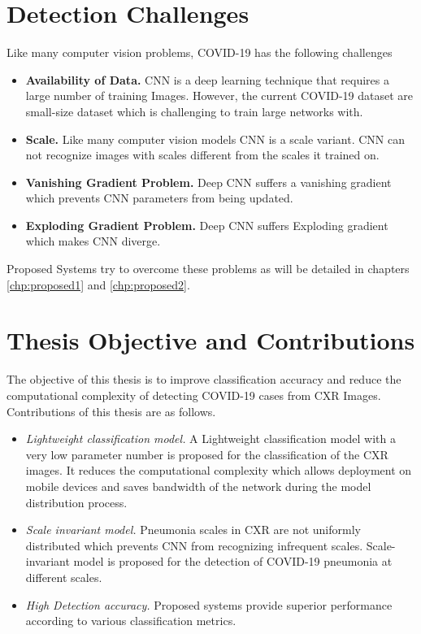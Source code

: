 \section{Detection Challenges}
Like many computer vision problems, COVID-19 has the following challenges
\begin{itemize}

\item \textbf{Availability of Data.} CNN is a deep learning technique that requires a large number of training Images. However, the current COVID-19 dataset are small-size dataset which is challenging to train large networks with. 
\item \textbf{Scale.} Like many computer vision models CNN is a scale variant. CNN can not recognize images with scales different from the scales it trained on.
\item \textbf{Vanishing Gradient Problem.} Deep CNN suffers a vanishing gradient which prevents CNN parameters from being updated.
\item \textbf{Exploding Gradient Problem.} Deep CNN suffers Exploding gradient which makes CNN diverge.
\end{itemize}
Proposed Systems try to overcome these problems as will be detailed in chapters \ref{chp:proposed1} and \ref{chp:proposed2}.

\section{Thesis Objective and Contributions}
The objective of this thesis is to improve classification accuracy and reduce the computational complexity of detecting COVID-19 cases from CXR Images. Contributions of this thesis are as follows.
\begin{itemize}
    \item \textit{Lightweight classification model.} A Lightweight classification model with a very low parameter number is proposed for the classification of the CXR images. It reduces the computational complexity which allows deployment on mobile devices and saves bandwidth of the network during the model distribution process. 
    \item \textit{Scale invariant model.}  Pneumonia scales in CXR are not uniformly distributed which prevents CNN from recognizing infrequent scales. Scale-invariant model is proposed for the detection of COVID-19 pneumonia at different scales.
    \item \textit{High Detection accuracy.} Proposed systems provide superior performance according to various classification metrics.
\end{itemize}

